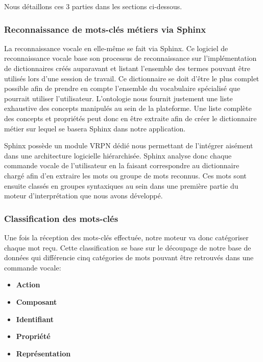 Nous détaillons ces 3 parties dans les sections ci-dessous.

\subsubsection{Reconnaissance de mots-clés métiers via Sphinx} \label{Sphinx}

La reconnaissance vocale en elle-même se fait via Sphinx. Ce logiciel de reconnaissance vocale base son processus de reconnaissance sur l'implémentation de dictionnaires créés auparavant et listant l'ensemble des termes pouvant être utilisés lors d'une session de travail. 
Ce dictionnaire se doit d'être le plus complet possible afin de prendre en compte l'ensemble du vocabulaire spécialisé que pourrait utiliser l'utilisateur. L'ontologie nous fournit justement une liste exhaustive des concepts manipulés au sein de la plateforme. Une liste complète des concepts et propriétés peut donc en être extraite afin de créer le dictionnaire métier sur lequel se basera Sphinx dans notre application.

Sphinx possède un module VRPN dédié nous permettant de l'intégrer aisément dans une architecture logicielle hiérarchisée. Sphinx analyse donc chaque commande vocale de l'utilisateur en la faisant correspondre au dictionnaire chargé afin d'en extraire les mots ou groupe de mots reconnus. Ces mots sont ensuite classés en groupes syntaxiques au sein dans une première partie du moteur d'interprétation que nous avons développé.

\subsubsection{Classification des mots-clés} \label{classification_keywords}

Une fois la réception des mots-clés effectuée, notre moteur va donc catégoriser chaque mot reçu. Cette classification se base sur le découpage de notre base de données qui différencie cinq catégories de mots pouvant être retrouvés dans une commande vocale:

\begin{itemize}
	\item \textbf{Action}
	\item \textbf{Composant}
	\item \textbf{Identifiant}
	\item \textbf{Propriété}
	\item \textbf{Représentation}
\end{itemize}

